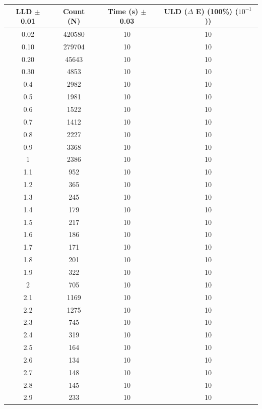 \documentclass[a4paper]{report}
\numberwithin{equation}{section}
\begin{document}
\begin{table}[!ht]
    \centering
	\begin{tabular}{|c|c|c|c|}
    \hline
	LLD $\pm$ 0.01 & Count (N) & Time (s) $\pm$ 0.03 & ULD ($\Delta$ E) (100\%) ($10^{-1}$)) \\ \hline
        0.02 & 420580 & 10 & 10 \\ \hline
        0.10 & 279704 & 10 & 10 \\ \hline
        0.20 & 45643 & 10 & 10 \\ \hline
        0.30 & 4853 & 10 & 10 \\ \hline
        0.4 & 2982 & 10 & 10 \\ \hline
        0.5 & 1981 & 10 & 10 \\ \hline
        0.6 & 1522 & 10 & 10 \\ \hline
        0.7 & 1412 & 10 & 10 \\ \hline
        0.8 & 2227 & 10 & 10 \\ \hline
        0.9 & 3368 & 10 & 10 \\ \hline
        1 & 2386 & 10 & 10 \\ \hline
        1.1 & 952 & 10 & 10 \\ \hline
        1.2 & 365 & 10 & 10 \\ \hline
        1.3 & 245 & 10 & 10 \\ \hline
        1.4 & 179 & 10 & 10 \\ \hline
        1.5 & 217 & 10 & 10 \\ \hline
        1.6 & 186 & 10 & 10 \\ \hline
        1.7 & 171 & 10 & 10 \\ \hline
        1.8 & 201 & 10 & 10 \\ \hline
        1.9 & 322 & 10 & 10 \\ \hline
        2 & 705 & 10 & 10 \\ \hline
        2.1 & 1169 & 10 & 10 \\ \hline
        2.2 & 1275 & 10 & 10 \\ \hline
        2.3 & 745 & 10 & 10 \\ \hline
        2.4 & 319 & 10 & 10 \\ \hline
        2.5 & 164 & 10 & 10 \\ \hline
        2.6 & 134 & 10 & 10 \\ \hline
        2.7 & 148 & 10 & 10 \\ \hline
        2.8 & 145 & 10 & 10 \\ \hline
        2.9 & 233 & 10 & 10 \\ \hline

\end{tabular}
\end{table}
\end{document}
